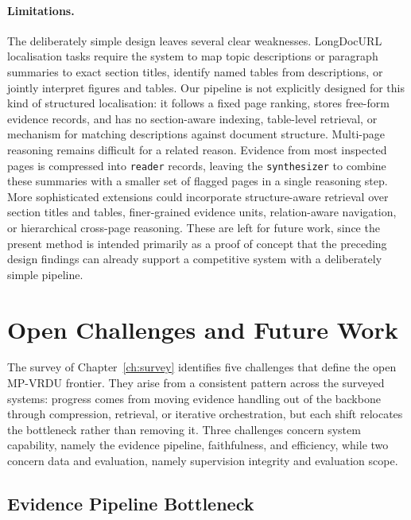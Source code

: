 \documentclass[11pt,twoside,openany]{report}
\begin{document}
\paragraph{Limitations.}
The deliberately simple design leaves several clear weaknesses. LongDocURL localisation tasks require the system to map topic descriptions or paragraph summaries to exact section titles, identify named tables from descriptions, or jointly interpret figures and tables. Our pipeline is not explicitly designed for this kind of structured localisation: it follows a fixed page ranking, stores free-form evidence records, and has no section-aware indexing, table-level retrieval, or mechanism for matching descriptions against document structure. Multi-page reasoning remains difficult for a related reason. Evidence from most inspected pages is compressed into \texttt{reader} records, leaving the \texttt{synthesizer} to combine these summaries with a smaller set of flagged pages in a single reasoning step. More sophisticated extensions could incorporate structure-aware retrieval over section titles and tables, finer-grained evidence units, relation-aware navigation, or hierarchical cross-page reasoning. These are left for future work, since the present method is intended primarily as a proof of concept that the preceding design findings can already support a competitive system with a deliberately simple pipeline.

\section{Open Challenges and Future Work}
\label{sec:conc_challenges}

The survey of Chapter~\ref{ch:survey} identifies five challenges that define the open MP-VRDU frontier. They arise from a consistent pattern across the surveyed systems: progress comes from moving evidence handling out of the backbone through compression, retrieval, or iterative orchestration, but each shift relocates the bottleneck rather than removing it. Three challenges concern system capability, namely the evidence pipeline, faithfulness, and efficiency, while two concern data and evaluation, namely supervision integrity and evaluation scope.

\subsection{Evidence Pipeline Bottleneck}
\label{sec:conc_pipeline}
\end{document}
